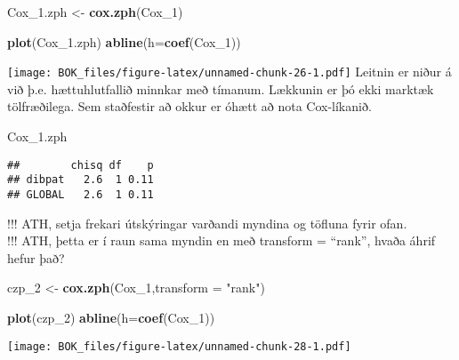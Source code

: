 \documentclass[
]{book}
\newenvironment{Shaded}{\begin{snugshade}}{\end{snugshade}}
\newcommand{\DataTypeTok}[1]{\textcolor[rgb]{0.13,0.29,0.53}{#1}}
\newcommand{\DecValTok}[1]{\textcolor[rgb]{0.00,0.00,0.81}{#1}}
\newcommand{\FloatTok}[1]{\textcolor[rgb]{0.00,0.00,0.81}{#1}}
\newcommand{\KeywordTok}[1]{\textcolor[rgb]{0.13,0.29,0.53}{\textbf{#1}}}
\newcommand{\NormalTok}[1]{#1}
\newcommand{\StringTok}[1]{\textcolor[rgb]{0.31,0.60,0.02}{#1}}
\begin{document}
\begin{Shaded}
\begin{Highlighting}[]
\NormalTok{Cox_}\FloatTok{1.}\NormalTok{zph <-}\StringTok{ }\KeywordTok{cox.zph}\NormalTok{(Cox_}\DecValTok{1}\NormalTok{)}
\end{Highlighting}
\end{Shaded}

\begin{Shaded}
\begin{Highlighting}[]
\KeywordTok{plot}\NormalTok{(Cox_}\FloatTok{1.}\NormalTok{zph)}
\KeywordTok{abline}\NormalTok{(}\DataTypeTok{h=}\KeywordTok{coef}\NormalTok{(Cox_}\DecValTok{1}\NormalTok{))}
\end{Highlighting}
\end{Shaded}

\texttt{[image: BOK\_files/figure-latex/unnamed-chunk-26-1.pdf]}
Leitnin er niður á við þ.e. hættuhlutfallið minnkar með tímanum. Lækkunin er þó ekki marktæk tölfræðilega. Sem staðfestir að okkur er óhætt að nota Cox-líkanið.

\begin{Shaded}
\begin{Highlighting}[]
\NormalTok{Cox_}\FloatTok{1.}\NormalTok{zph}
\end{Highlighting}
\end{Shaded}

\begin{verbatim}
##        chisq df    p
## dibpat   2.6  1 0.11
## GLOBAL   2.6  1 0.11
\end{verbatim}

!!! ATH, setja frekari útskýringar varðandi myndina og töfluna fyrir ofan.\\
!!! ATH, þetta er í raun sama myndin en með transform = ``rank'', hvaða áhrif hefur það?

\begin{Shaded}
\begin{Highlighting}[]
\NormalTok{czp_}\DecValTok{2}\NormalTok{ <-}\StringTok{ }\KeywordTok{cox.zph}\NormalTok{(Cox_}\DecValTok{1}\NormalTok{,}\DataTypeTok{transform =} \StringTok{"rank"}\NormalTok{)}

\KeywordTok{plot}\NormalTok{(czp_}\DecValTok{2}\NormalTok{)}
\KeywordTok{abline}\NormalTok{(}\DataTypeTok{h=}\KeywordTok{coef}\NormalTok{(Cox_}\DecValTok{1}\NormalTok{))}
\end{Highlighting}
\end{Shaded}

\texttt{[image: BOK\_files/figure-latex/unnamed-chunk-28-1.pdf]}
\end{document}
